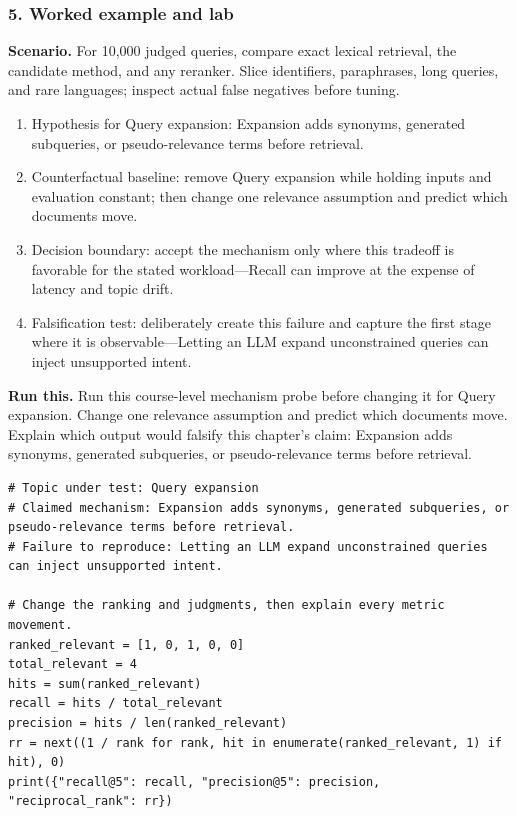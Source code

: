 \subsubsection*{5. Worked example and lab}
\textbf{Scenario.} For 10,000 judged queries, compare exact lexical retrieval, the candidate method, and any reranker. Slice identifiers, paraphrases, long queries, and rare languages; inspect actual false negatives before tuning.
\begin{enumerate}
\item Hypothesis for Query expansion: Expansion adds synonyms, generated subqueries, or pseudo-relevance terms before retrieval.
\item Counterfactual baseline: remove Query expansion while holding inputs and evaluation constant; then change one relevance assumption and predict which documents move.
\item Decision boundary: accept the mechanism only where this tradeoff is favorable for the stated workload—Recall can improve at the expense of latency and topic drift.
\item Falsification test: deliberately create this failure and capture the first stage where it is observable—Letting an LLM expand unconstrained queries can inject unsupported intent.
\end{enumerate}
\textbf{Run this.} Run this course-level mechanism probe before changing it for Query expansion. Change one relevance assumption and predict which documents move. Explain which output would falsify this chapter's claim: Expansion adds synonyms, generated subqueries, or pseudo-relevance terms before retrieval.
\begin{Verbatim}[fontsize=\scriptsize]
# Topic under test: Query expansion
# Claimed mechanism: Expansion adds synonyms, generated subqueries, or pseudo-relevance terms before retrieval.
# Failure to reproduce: Letting an LLM expand unconstrained queries can inject unsupported intent.

# Change the ranking and judgments, then explain every metric movement.
ranked_relevant = [1, 0, 1, 0, 0]
total_relevant = 4
hits = sum(ranked_relevant)
recall = hits / total_relevant
precision = hits / len(ranked_relevant)
rr = next((1 / rank for rank, hit in enumerate(ranked_relevant, 1) if hit), 0)
print({"recall@5": recall, "precision@5": precision, "reciprocal_rank": rr})
\end{Verbatim}
